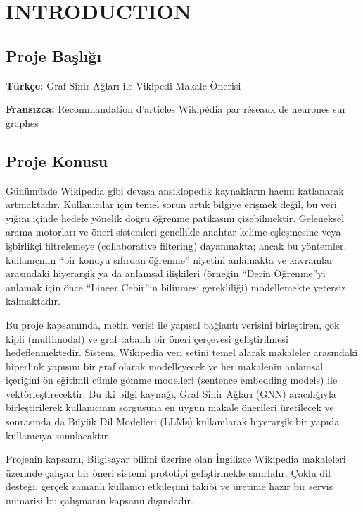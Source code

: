 \chapter{INTRODUCTION}
\thispagestyle{empty} %

\section{Proje Başlığı}

\textbf{Türkçe:} Graf Sinir Ağları ile Vikipedi Makale Önerisi

\textbf{Fransızca:} Recommandation d'articles Wikipédia par réseaux de neurones sur graphes

\section{Proje Konusu}

Günümüzde Wikipedia gibi devasa ansiklopedik kaynakların hacmi katlanarak artmaktadır. Kullanıcılar için temel sorun artık bilgiye erişmek değil, bu veri yığını içinde hedefe yönelik doğru öğrenme patikasını çizebilmektir. Geleneksel arama motorları ve öneri sistemleri genellikle anahtar kelime eşleşmesine veya işbirlikçi filtrelemeye (collaborative filtering) dayanmakta; ancak bu yöntemler, kullanıcının ``bir konuyu sıfırdan öğrenme'' niyetini anlamakta ve kavramlar arasındaki hiyerarşik ya da anlamsal ilişkileri (örneğin ``Derin Öğrenme''yi anlamak için önce ``Lineer Cebir''in bilinmesi gerekliliği) modellemekte yetersiz kalmaktadır.

Bu proje kapsamında, metin verisi ile yapısal bağlantı verisini birleştiren, çok kipli (multimodal) ve graf tabanlı bir öneri çerçevesi geliştirilmesi hedeflenmektedir. Sistem, Wikipedia veri setini temel alarak makaleler arasındaki hiperlink yapısını bir graf olarak modelleyecek ve her makalenin anlamsal içeriğini ön eğitimli cümle gömme modelleri (sentence embedding models) ile vektörleştirecektir. Bu iki bilgi kaynağı, Graf Sinir Ağları (GNN) aracılığıyla birleştirilerek kullanıcının sorgusuna en uygun makale önerileri üretilecek ve sonrasında da Büyük Dil Modelleri (LLMs) kullanılarak hiyerarşik bir yapıda kullanıcıya sunulacaktır.

Projenin kapsamı, Bilgisayar bilimi üzerine olan İngilizce Wikipedia makaleleri üzerinde çalışan bir öneri sistemi prototipi geliştirmekle sınırlıdır. Çoklu dil desteği, gerçek zamanlı kullanıcı etkileşimi takibi ve üretime hazır bir servis mimarisi bu çalışmanın kapsamı dışındadır.

